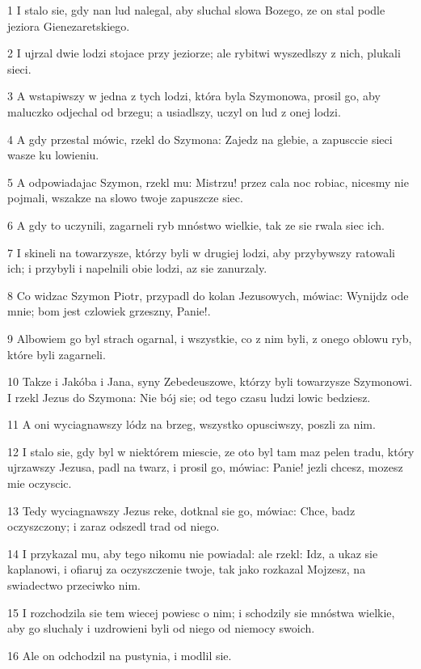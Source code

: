 \par 1 I stalo sie, gdy nan lud nalegal, aby sluchal slowa Bozego, ze on stal podle jeziora Gienezaretskiego.
\par 2 I ujrzal dwie lodzi stojace przy jeziorze; ale rybitwi wyszedlszy z nich, plukali sieci.
\par 3 A wstapiwszy w jedna z tych lodzi, która byla Szymonowa, prosil go, aby maluczko odjechal od brzegu; a usiadlszy, uczyl on lud z onej lodzi.
\par 4 A gdy przestal mówic, rzekl do Szymona: Zajedz na glebie, a zapusccie sieci wasze ku lowieniu.
\par 5 A odpowiadajac Szymon, rzekl mu: Mistrzu! przez cala noc robiac, nicesmy nie pojmali, wszakze na slowo twoje zapuszcze siec.
\par 6 A gdy to uczynili, zagarneli ryb mnóstwo wielkie, tak ze sie rwala siec ich.
\par 7 I skineli na towarzysze, którzy byli w drugiej lodzi, aby przybywszy ratowali ich; i przybyli i napelnili obie lodzi, az sie zanurzaly.
\par 8 Co widzac Szymon Piotr, przypadl do kolan Jezusowych, mówiac: Wynijdz ode mnie; bom jest czlowiek grzeszny, Panie!.
\par 9 Albowiem go byl strach ogarnal, i wszystkie, co z nim byli, z onego oblowu ryb, które byli zagarneli.
\par 10 Takze i Jakóba i Jana, syny Zebedeuszowe, którzy byli towarzysze Szymonowi. I rzekl Jezus do Szymona: Nie bój sie; od tego czasu ludzi lowic bedziesz.
\par 11 A oni wyciagnawszy lódz na brzeg, wszystko opusciwszy, poszli za nim.
\par 12 I stalo sie, gdy byl w niektórem miescie, ze oto byl tam maz pelen tradu, który ujrzawszy Jezusa, padl na twarz, i prosil go, mówiac: Panie! jezli chcesz, mozesz mie oczyscic.
\par 13 Tedy wyciagnawszy Jezus reke, dotknal sie go, mówiac: Chce, badz oczyszczony; i zaraz odszedl trad od niego.
\par 14 I przykazal mu, aby tego nikomu nie powiadal: ale rzekl: Idz, a ukaz sie kaplanowi, i ofiaruj za oczyszczenie twoje, tak jako rozkazal Mojzesz, na swiadectwo przeciwko nim.
\par 15 I rozchodzila sie tem wiecej powiesc o nim; i schodzily sie mnóstwa wielkie, aby go sluchaly i uzdrowieni byli od niego od niemocy swoich.
\par 16 Ale on odchodzil na pustynia, i modlil sie.
